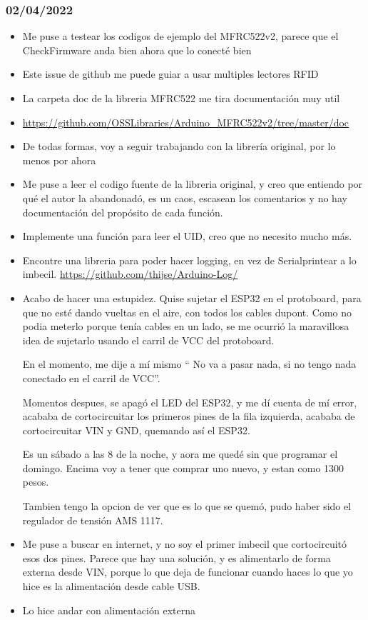 \documentclass[../informe_krapp.tex]{subfiles}
\begin{document}
\subsubsection{02/04/2022}
\begin{itemize}
	\item Me puse a testear los codigos de ejemplo del MFRC522v2, parece que el
	      CheckFirmware anda bien ahora que lo conecté bien
	\item Este issue de github me puede guiar a usar multiples lectores RFID
	\item La carpeta doc de la libreria MFRC522 me tira documentación muy util
	\item \url{https://github.com/OSSLibraries/Arduino_MFRC522v2/tree/master/doc}
	\item De todas formas, voy a seguir trabajando con la librería original, por lo menos
	      por ahora
	\item Me puse a leer el codigo fuente de la libreria original, y creo que entiendo por
	      qué el autor la abandonadó, es un caos, escasean los comentarios
	      y no hay documentación del propósito de cada función.
	\item Implemente una función para leer el UID, creo que no necesito mucho más.

	\item Encontre una libreria para poder hacer logging, en vez de Serialprintear a
	      lo imbecil. \url{https://github.com/thijse/Arduino-Log/}

	\item Acabo de hacer una estupidez. Quise sujetar el ESP32 en el protoboard,
	      para que no esté dando vueltas en el aire, con todos los cables dupont.
	      Como no podia meterlo porque tenía cables en un lado, se me ocurrió la
	      maravillosa idea de sujetarlo usando el carril de VCC del protoboard.

	      En el momento, me dije a mí mismo `` No va a pasar nada, si no tengo nada
	      conectado en el carril de VCC''.

	      Momentos despues, se apagó el LED del ESP32, y me dí cuenta de mí error,
	      acababa de cortocircuitar los primeros pines de la fila izquierda,
	      acababa de cortocircuitar VIN y GND, quemando así el ESP32.

	      Es un sábado a las 8 de la noche, y aora me quedé sin que programar el domingo.
	      Encima voy a tener que comprar uno nuevo, y estan como 1300 pesos.

	      Tambien tengo la opcion de ver que es lo que se quemó, pudo haber sido
	      el regulador de tensión AMS 1117.

	\item Me puse a buscar en internet, y no soy el primer imbecil que cortocircuitó
	      esos dos pines. Parece que hay una solución, y es alimentarlo de forma externa
	      desde VIN, porque lo que deja de funcionar cuando haces lo que yo hice
	      es la alimentación desde cable USB.

	\item Lo hice andar con alimentación externa
\end{itemize}
\end{document}
